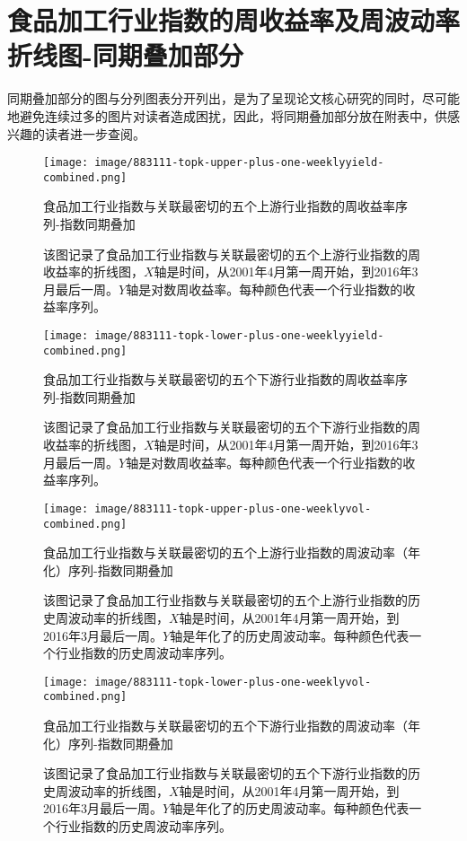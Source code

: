 \documentclass{sysuthesis}
\begin{document}
\chapter{食品加工行业指数的周收益率及周波动率折线图-同期叠加部分}

同期叠加部分的图与分列图表分开列出，是为了呈现论文核心研究的同时，尽可能地避免连续过多的图片对读者造成困扰，因此，将同期叠加部分放在附表中，供感兴趣的读者进一步查阅。

\begin{figure}[htbp]
\centering
\texttt{[image: image/883111-topk-upper-plus-one-weeklyyield-combined.png]}
\caption{食品加工行业指数与关联最密切的五个上游行业指数的周收益率序列-指数同期叠加}
\caption*{\footnotesize 该图记录了食品加工行业指数与关联最密切的五个上游行业指数的周收益率的折线图，$X$轴是时间，从2001年4月第一周开始，到2016年3月最后一周。$Y$轴是对数周收益率。每种颜色代表一个行业指数的收益率序列。}
\label{fig:883111-topk-upper-plus-one-weeklyyield-combined}
\end{figure}

\begin{figure}[htbp]
\centering
\texttt{[image: image/883111-topk-lower-plus-one-weeklyyield-combined.png]}
\caption{食品加工行业指数与关联最密切的五个下游行业指数的周收益率序列-指数同期叠加}
\caption*{\footnotesize 该图记录了食品加工行业指数与关联最密切的五个下游行业指数的周收益率的折线图，$X$轴是时间，从2001年4月第一周开始，到2016年3月最后一周。$Y$轴是对数周收益率。每种颜色代表一个行业指数的收益率序列。}
\label{fig:883111-topk-lower-plus-one-weeklyyield-combined}
\end{figure}

\begin{figure}[htbp]
\centering
\texttt{[image: image/883111-topk-upper-plus-one-weeklyvol-combined.png]}
\caption{食品加工行业指数与关联最密切的五个上游行业指数的周波动率（年化）序列-指数同期叠加}
\caption*{\footnotesize 该图记录了食品加工行业指数与关联最密切的五个上游行业指数的历史周波动率的折线图，$X$轴是时间，从2001年4月第一周开始，到2016年3月最后一周。$Y$轴是年化了的历史周波动率。每种颜色代表一个行业指数的历史周波动率序列。}
\label{fig:883111-topk-upper-plus-one-weeklyvol-combined}
\end{figure}
\begin{figure}[htbp]
\centering
\texttt{[image: image/883111-topk-lower-plus-one-weeklyvol-combined.png]}
\caption{食品加工行业指数与关联最密切的五个下游行业指数的周波动率（年化）序列-指数同期叠加}
\caption*{\footnotesize 该图记录了食品加工行业指数与关联最密切的五个下游行业指数的历史周波动率的折线图，$X$轴是时间，从2001年4月第一周开始，到2016年3月最后一周。$Y$轴是年化了的历史周波动率。每种颜色代表一个行业指数的历史周波动率序列。}
\label{fig:883111-topk-lower-plus-one-weeklyvol-combined}
\end{figure}
\end{document}
